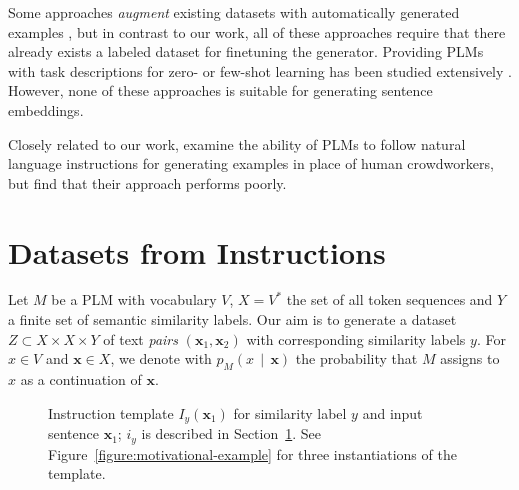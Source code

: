 \documentclass[11pt]{article}
\newcommand\oursFull{Datasets from Instructions}
\newcommand\given{\,{\mid}\,}
\begin{document}
Some approaches \emph{augment} existing datasets with
automatically generated
examples \citep{Anaby-Tavor_Carmeli_Goldbraich_Kantor_Kour_Shlomov_Tepper_Zwerdling_2020,papanikolaou2020dare,yang-etal-2020-generative,mohapatra2020simulated,kumar2021data},
but in contrast to our work, all of these approaches require
that there already exists a labeled dataset for finetuning the generator.
Providing PLMs with task descriptions for zero- or few-shot learning has been studied extensively \citep[e.g.,][]{radford2018language,puri2019zeroshot,brown2020language,schick2020fewshot,schick2020just,schick2020exploiting,Weller_2020,gao2020making,tam2021improving}. However, none of these approaches is suitable for generating sentence embeddings.

Closely related to our work, \citet{efrat2020turking}
examine the ability of PLMs to follow natural language
instructions for generating examples in place of human
crowdworkers, but
find that their
approach  performs poorly. 

\section{\oursFull{}}
\label{section:method}

Let $M$ be a PLM with vocabulary $V$, $X = V^*$ the set of all token sequences and $Y$  a finite set of semantic similarity labels. Our aim is to generate a dataset $Z \subset X \times X \times Y$ of text \emph{pairs} $(\mathbf{x}_1, \mathbf{x}_2)$ with corresponding similarity labels $y$. For $x \in V$ and $\mathbf{x} \in X$, we denote with $p_M(x \given \mathbf{x})$ the probability that $M$ assigns to $x$ as a continuation of $\mathbf{x}$.

\begin{figure}
	\centering
	\caption{Instruction template $I_y(\mathbf{x}_1)$
		for similarity label $y$ and input sentence
		$\mathbf{x}_1$; $i_y$ is described in
		Section~\ref{section:method}. See
		Figure~\ref{figure:motivational-example} for
		three instantiations of the template.}
	\label{figure:instruction-template}
\end{figure}
\end{document}
